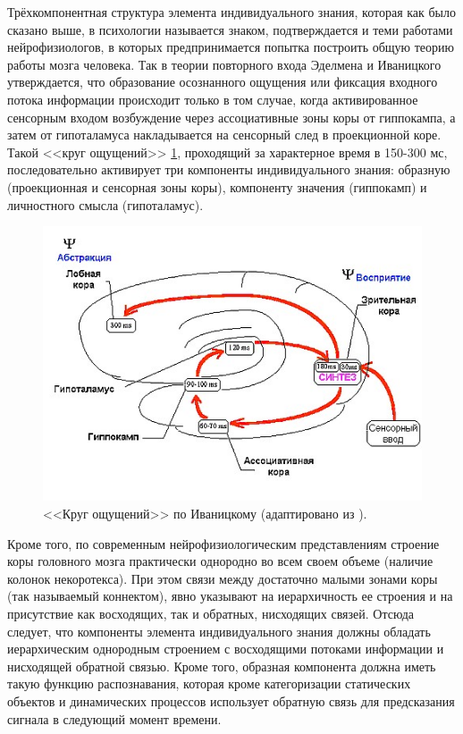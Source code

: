 \documentclass[a4paper, 12pt]{article}
\theoremstyle{plain}
\begin{document}
	Трёхкомпонентная структура элемента индивидуального знания, которая как было сказано выше, в психологии называется знаком, подтверждается и теми работами нейрофизиологов, в которых предпринимается попытка построить общую теорию работы мозга человека. Так в теории повторного входа Эделмена \cite{Edelmen1981} и Иваницкого \cite{Ivanitsky1996} утверждается, что образование осознанного ощущения или фиксация входного потока информации происходит только в том случае, когда активированное сенсорным входом возбуждение через ассоциативные зоны коры от гиппокампа, а затем от гипоталамуса накладывается на сенсорный след в проекционной коре. Такой <<круг ощущений>> \ref{fig:ivan_cyrcle}, проходящий за характерное время в 150-300 мс, последовательно активирует три компоненты индивидуального знания: образную (проекционная и сенсорная зоны коры), компоненту значения (гиппокамп) и личностного смысла (гипоталамус).
	
	\begin{figure}[h]
		\centering
		\includegraphics[width=0.7\linewidth]{ivanitsky_cyrcle}
		\caption{<<Круг ощущений>> по Иваницкому (адаптировано из \cite{Ivanitsky1996}).}
		\label{fig:ivan_cyrcle}
	\end{figure}
	
	Кроме того, по современным нейрофизиологическим представлениям строение коры головного мозга практически однородно во всем своем объеме (наличие колонок некоротекса). При этом связи между достаточно малыми зонами коры (так называемый коннектом), явно указывают на иерархичность ее строения и на присутствие как восходящих, так и обратных, нисходящих связей. Отсюда следует, что компоненты элемента индивидуального знания должны обладать иерархическим однородным строением с восходящими потоками информации и нисходящей обратной связью. Кроме того, образная компонента должна иметь такую функцию распознавания, которая кроме категоризации статических объектов и динамических процессов использует обратную связь для предсказания сигнала в следующий момент времени.
	
\end{document}
